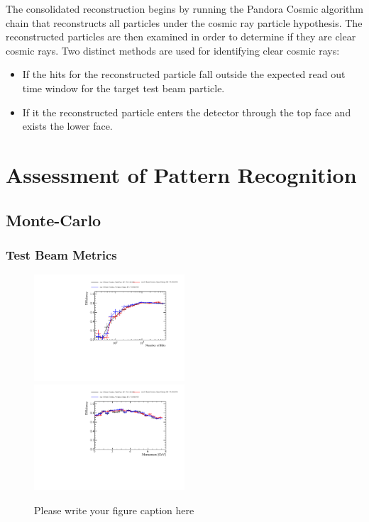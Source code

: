 The consolidated reconstruction begins by running the Pandora Cosmic algorithm chain that reconstructs all particles under the cosmic ray particle hypothesis.  The reconstructed particles are then examined in order to determine if they are clear cosmic rays.  Two distinct methods are used for identifying clear cosmic rays:

\begin{itemize}
\item If the hits for the reconstructed particle fall outside the expected read out time window for the target test beam particle.
\item If it the reconstructed particle enters the detector through the top face and exists the lower face.  
\end{itemize}


\section{Assessment of Pattern Recognition}

\subsection{Monte-Carlo}

\subsubsection{Test Beam Metrics}

\begin{figure}
\includegraphics[width=0.5\textwidth]{Figures/Metrics/MC/Beam/BeamParticleEfficiencyBreakdownVsNHits.pdf}
\includegraphics[width=0.5\textwidth]{Figures/Metrics/MC/Beam/BeamParticleEfficiencyBreakdownVsMomentum.pdf}
\caption{Please write your figure caption here}
\label{fig:1}
\end{figure}

